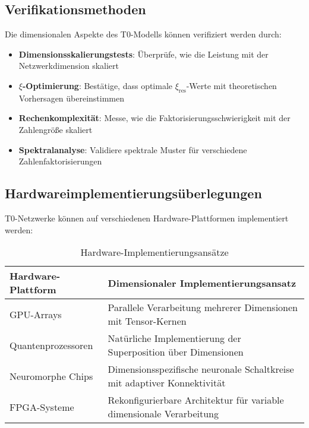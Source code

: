 \documentclass[12pt,a4paper]{article}
\newcommand{\xipar}{\ensuremath{\xi}}
\begin{document}
	\subsection{Verifikationsmethoden}
	\label{subsec:verification_methods}
	
	Die dimensionalen Aspekte des T0-Modells können verifiziert werden durch:
	
	\begin{itemize}
		\item \textbf{Dimensionsskalierungstests}: Überprüfe, wie die Leistung mit der Netzwerkdimension skaliert
		\item \textbf{$\xipar$-Optimierung}: Bestätige, dass optimale $\xipar_{\text{res}}$-Werte mit theoretischen Vorhersagen übereinstimmen
		\item \textbf{Rechenkomplexität}: Messe, wie die Faktorisierungsschwierigkeit mit der Zahlengröße skaliert
		\item \textbf{Spektralanalyse}: Validiere spektrale Muster für verschiedene Zahlenfaktorisierungen
	\end{itemize}
	
	\subsection{Hardwareimplementierungsüberlegungen}
	\label{subsec:hardware_implementation}
	
	T0-Netzwerke können auf verschiedenen Hardware-Plattformen implementiert werden:
	
	\begin{table}[htbp]
		\centering
		\begin{tabular}{lp{8cm}}
			\toprule
			\textbf{Hardware-Plattform} & \textbf{Dimensionaler Implementierungsansatz} \\
			\midrule
			GPU-Arrays & Parallele Verarbeitung mehrerer Dimensionen mit Tensor-Kernen \\
			Quantenprozessoren & Natürliche Implementierung der Superposition über Dimensionen \\
			Neuromorphe Chips & Dimensionsspezifische neuronale Schaltkreise mit adaptiver Konnektivität \\
			FPGA-Systeme & Rekonfigurierbare Architektur für variable dimensionale Verarbeitung \\
			\bottomrule
		\end{tabular}
		\caption{Hardware-Implementierungsansätze}
		\label{tab:hardware_approaches}
	\end{table}
	
\end{document}
